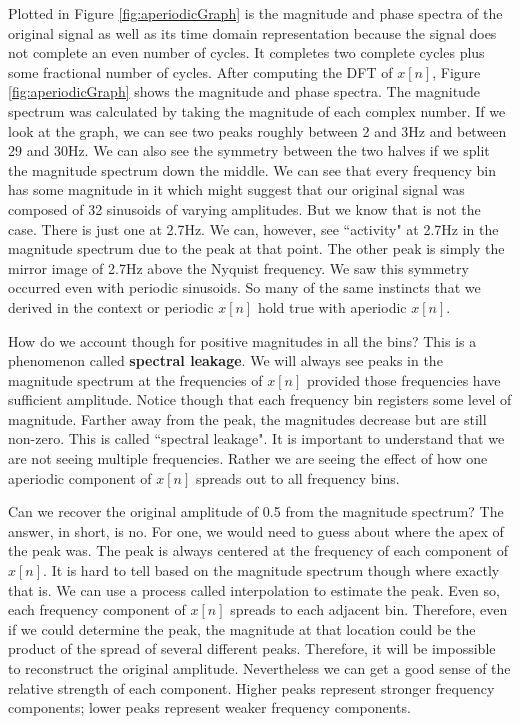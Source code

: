 Plotted in Figure \ref{fig:aperiodicGraph} is the magnitude and phase spectra of the original signal as well as its time 
domain representation because the signal does not complete an even number of cycles.  It completes
two complete cycles plus some fractional number of cycles.  After computing the DFT of $x[n]$, Figure 
\ref{fig:aperiodicGraph} shows the magnitude and phase spectra.
The magnitude spectrum was calculated by taking the magnitude of each complex number.  
If we look at the graph, we can see two peaks roughly between 2 and 3Hz
and between 29 and 30Hz.  We can also see the symmetry between the two halves if we split the magnitude spectrum
down the middle.  We can see that every frequency bin has some magnitude in it which might suggest that our original
signal was composed of 32 sinusoids of varying amplitudes.  But we know that is not the case.  There is just one at
2.7Hz.  We can, however, see ``activity" at 2.7Hz in the magnitude spectrum due to the peak at that point.  The other peak
is simply the mirror image of 2.7Hz above the Nyquist frequency.  We saw this symmetry occurred even with periodic
sinusoids.  So many of the same instincts that we derived in the context or periodic $x[n]$ hold true with aperiodic 
$x[n]$. 

How do we account though for positive magnitudes in all the bins?  This is a phenomenon called \textbf{spectral leakage}.  
We will always see peaks in the magnitude spectrum at the frequencies of $x[n]$ provided those frequencies have
sufficient amplitude.  Notice though that each frequency bin registers some level of magnitude.  Farther away from the 
peak, the magnitudes decrease but are still non-zero.  This is called ``spectral leakage".  It is important to understand
that we are not seeing multiple frequencies.  Rather we are seeing the effect of how one aperiodic component of $x[n]$
spreads out to all frequency bins.   

Can we recover the original amplitude of 0.5 from the magnitude spectrum?  The answer, in short, is no.  For one, we
would need to guess about where the apex of the peak was.  The peak is always centered at the frequency of each
component of $x[n]$.  It is hard to tell based on the magnitude spectrum though where exactly that is.  We can use
a process called interpolation to estimate the peak.  Even so, each frequency component of $x[n]$ spreads to each
adjacent bin.  Therefore, even if we could determine the peak, the magnitude at that location could be the product
of the spread of several different peaks.  Therefore, it will be impossible to reconstruct the original amplitude.  
Nevertheless we can get a good sense of the relative strength of each component.  Higher peaks represent stronger
frequency components; lower peaks represent weaker frequency components.

